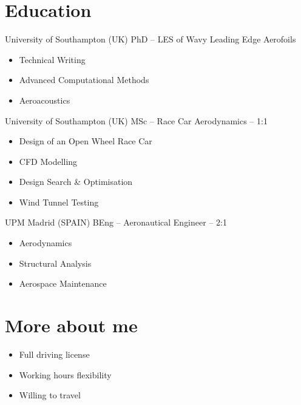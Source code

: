 \documentclass[fontsize=10pt]{tccv}
\begin{document}
\section{Education}
\begin{eventlist}
     	{University of Southampton (UK)}
     	{PhD -- \normalsize{LES of Wavy Leading Edge Aerofoils}} 
	\begin{itemize}
	\itemsep -1pt
		\item Technical Writing
		\item Advanced Computational Methods
		\item Aeroacoustics
	\end{itemize}

     	{University of Southampton (UK)}
     	{MSc -- Race Car Aerodynamics -- 1:1} 
  	\begin{itemize}
	\itemsep -1pt
	   \item Design of an Open Wheel Race Car
	   \item CFD Modelling
	   \item Design Search \& Optimisation
	   \item Wind Tunnel Testing
	\end{itemize}

	{UPM Madrid (SPAIN)}
	{BEng -- Aeronautical Engineer -- 2:1}
  	\begin{itemize}
	\itemsep -1pt
	   \item Aerodynamics
	   \item Structural Analysis
	   \item Aerospace Maintenance
	\end{itemize}
\end{eventlist}

\vspace{-20pt}
\section{More about me} 
\begin{itemize}
	\itemsep -1pt
	\item Full driving license
	\item Working hours flexibility
	\item Willing to travel
\end{itemize}
\end{document}
